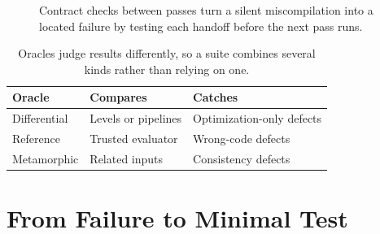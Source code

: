 \begin{figure}[htbp]
\centering
{}
\caption{Contract checks between passes turn a silent miscompilation into a located failure by testing each handoff before the next pass runs.}
\label{fig:ch37-pipeline}
\end{figure}

\begin{table}[htbp]
\centering
\caption{Oracles judge results differently, so a suite combines several kinds rather than relying on one.}
\label{tab:ch37-oracles}
\begin{tabular}{lll}
\toprule
Oracle & Compares & Catches \\
\midrule
Differential & Levels or pipelines & Optimization-only defects \\
Reference & Trusted evaluator & Wrong-code defects \\
Metamorphic & Related inputs & Consistency defects \\
\bottomrule
\end{tabular}
\end{table}

\section{From Failure to Minimal Test}\label{sec:ch37-minimize}


